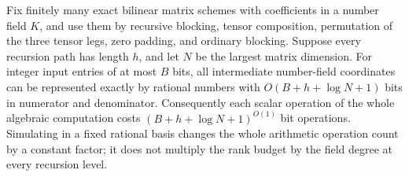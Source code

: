 \begin{lemma}
\label{lem:height-bridge}
Fix finitely many exact bilinear matrix schemes with coefficients in a
number field $K$, and use them by recursive blocking, tensor composition,
permutation of the three tensor legs, zero padding, and ordinary blocking.
Suppose every recursion path has length $h$, and let $N$ be the largest matrix dimension.
For integer input entries of at most $B$ bits, all intermediate number-field
coordinates can be represented exactly by rational numbers with
$O(B+h+\log N+1)$ bits in numerator and denominator.
Consequently each scalar operation of the whole algebraic computation
costs $(B+h+\log N+1)^{O(1)}$ bit operations. Simulating in a fixed rational basis
changes the whole arithmetic operation count by a constant factor; it does
not multiply the rank budget by the field degree at every recursion level.
\end{lemma}

